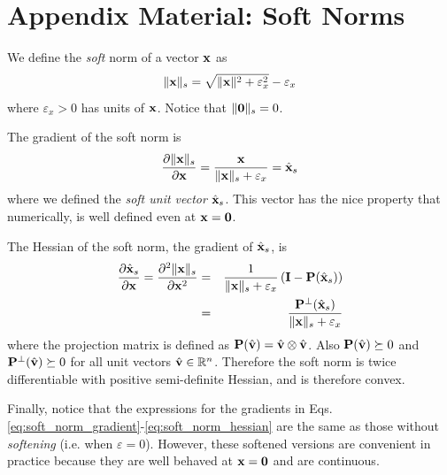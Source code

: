 \section{Appendix Material: Soft Norms}
\label{sec:soft_norms}

We define the \emph{soft} norm of a vector ${\mathbf{x}}$ as
\begin{equation}
    \Vert\mf{x}\Vert_s = \sqrt{\Vert\mf{x}\Vert^2+\varepsilon_x^2}-\varepsilon_x
    \label{eq:soft_norm_gradient}
\end{equation}
where $\varepsilon_x>0$ has units of ${\mathbf{x}}$. Notice that $\Vert{\mathbf{0}}\Vert_s= 0$.

The gradient of the soft norm is
\begin{equation}
    \frac{\partial\Vert\mf{x}\Vert_s}{\partial \mf{x}} = \frac{\mf{x}}{\Vert\mf{x}\Vert_s+\varepsilon_x} = \hat{\mf{x}}_s
    \label{eq:soft_norm_hessian}
\end{equation}
where we defined the \emph{soft unit vector} $\hat{{\mathbf{x}}}_s$. This vector has the nice property that numerically, is well defined even at ${\mathbf{x}}={\mathbf{0}}$.

The Hessian of the soft norm, the gradient of $\hat{{\mathbf{x}}}_s$, is
\begin{eqnarray}
    \frac{\partial\hat{{\mathbf{x}}}_s}{\partial{\mathbf{x}}}=\frac{\partial^2\Vert{\mathbf{x}}\Vert_s}{\partial{\mathbf{x}}^2}&=&\frac{1}{\Vert{\mathbf{x}}\Vert_s+\varepsilon_x}\left({\mathbf{I}}-{\mathbf{P}}(\hat{{\mathbf{x}}}_s)\right)\nonumber\\
    &=&\frac{{\mathbf{P}}^\perp(\hat{{\mathbf{x}}}_s)}{{\Vert{\mathbf{x}}\Vert_s+\varepsilon_x}}
\end{eqnarray}
where the projection matrix is defined as ${\mathbf{P}}(\hat{{\mathbf{v}}})=\hat{{\mathbf{v}}}\otimes\hat{{\mathbf{v}}}$. Also ${\mathbf{P}}(\hat{{\mathbf{v}}}) \succeq 0$ and ${\mathbf{P}}^\perp(\hat{{\mathbf{v}}}) \succeq 0$ for all unit vectors $\hat{{\mathbf{v}}}\in\mathbb{R}^n$. Therefore the soft norm is twice differentiable with positive semi-definite Hessian, and is therefore convex.

Finally, notice that the expressions for the gradients in Eqs. \eqref{eq:soft_norm_gradient}-\eqref{eq:soft_norm_hessian} are the same as those without \emph{softening} (i.e. when $\varepsilon=0$). However, these softened versions are convenient in practice because they are well behaved at ${\mathbf{x}}={\mathbf{0}}$ and are continuous.

